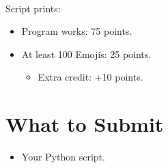 \documentclass[letter,10pt]{article}
\begin{document}
    \paragraph{}Script prints:
    \begin{itemize}
        \item Program works: 75 points.
        \item At least 100 Emojis: 25 points.
        \begin{itemize}
            \item Extra credit: +10 points.
        \end{itemize}
    \end{itemize}
    
    \section*{What to Submit}
    \begin{itemize}
        \item Your Python script.
    \end{itemize}
    
\end{document}
